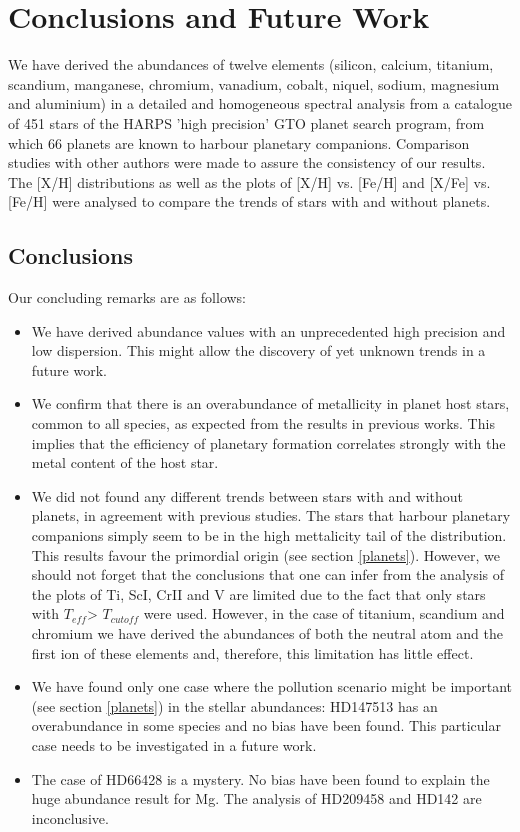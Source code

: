\documentclass[dvips,12pt,a4paper]{report}
\begin{document}
{{\chapter{Conclusions and Future Work}

We have derived the abundances of twelve elements (silicon, calcium, titanium, scandium, manganese, chromium, vanadium, cobalt, niquel, sodium, magnesium and aluminium) in a detailed and homogeneous spectral analysis from a catalogue of 451 stars of the HARPS 'high precision' GTO planet search program, from which 66 planets are known to harbour planetary companions. Comparison studies with other authors were made to assure the consistency of our results. The [X/H] distributions as well as the plots of [X/H] vs. [Fe/H] and [X/Fe] vs. [Fe/H] were analysed to compare the trends of stars with and without planets. 


\section {Conclusions}

Our concluding remarks are as follows:

\begin{itemize}
 
\item We have derived abundance values with an unprecedented high precision and low dispersion. This might allow the discovery of yet unknown trends in a future work. 
\item We confirm that there is an overabundance of metallicity in planet host stars, common to all species, as expected from the results in previous works. This implies that the efficiency of planetary formation correlates strongly with the metal content of the host star. 
\item We did not found any different trends between stars with and without planets, in agreement with previous studies. The stars that harbour planetary companions simply seem to be in the high mettalicity tail of the distribution. This results favour the primordial origin (see section \ref{planets}). However, we should not forget that the conclusions that one can infer from the analysis of the plots of Ti, ScI, CrII and V are limited due to the fact that only stars with $T_{eff}$> $T_{cutoff}$ were used. However, in the case of titanium, scandium and chromium we have derived the abundances of both the neutral atom and the first ion of these elements and, therefore, this limitation has little effect.  %
\item We have found only one case where the pollution scenario might be important (see section \ref{planets}) in the stellar abundances: HD147513 has an overabundance in some species and no bias have been found. This particular case needs to be investigated in a future work.
\item The case of HD66428 is a mystery. No bias have been found to explain the huge abundance result for Mg. The analysis of HD209458 and HD142 are inconclusive. 



\end{itemize}}}
\end{document}
